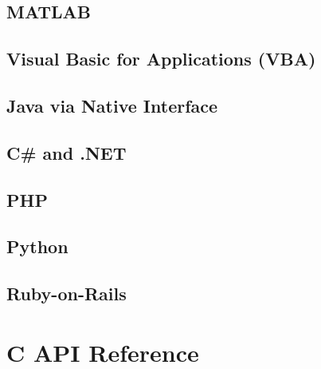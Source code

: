 \documentclass{article}
\begin{document}
\subsection{MATLAB}
\subsection{Visual Basic for Applications (VBA)}
\subsection{Java via Native Interface}
\subsection{C\# and .NET}
\subsection{PHP}
\subsection{Python}
\subsection{Ruby-on-Rails}

\section{C API Reference}
\label{sec_api_ref}

%
\end{document}
